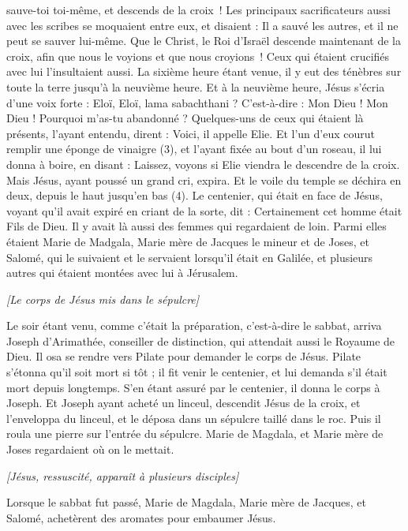 \begin{multicols}{2}
sauve-toi toi-même, et descends de la croix !
Les principaux sacrificateurs aussi avec les scribes se moquaient entre eux, et disaient : Il a sauvé les autres, et il ne peut se sauver lui-même.
Que le Christ, le Roi d’Israël descende maintenant de la croix, afin que nous le voyions et que nous croyions ! Ceux qui étaient crucifiés avec lui l’insultaient aussi.
La sixième heure étant venue, il y eut des ténèbres sur toute la terre jusqu'à la neuvième heure.
Et à la neuvième heure, Jésus s’écria d’une voix forte : Eloï, Eloï, lama sabachthani ? C’est-à-dire : Mon Dieu ! Mon Dieu ! Pourquoi m'as-tu abandonné ?
Quelques-uns de ceux qui étaient là présents, l’ayant entendu, dirent : Voici, il appelle Elie.
Et l’un d’eux courut remplir une éponge de vinaigre (3), et l'ayant fixée au bout d'un roseau, il lui donna à boire, en disant : Laissez, voyons si Elie viendra le descendre de la croix.
Mais Jésus, ayant poussé un grand cri, expira.
Et le voile du temple se déchira en deux, depuis le haut jusqu'en bas (4).
Le centenier, qui était en face de Jésus, voyant qu'il avait expiré en criant de la sorte, dit : Certainement cet homme était Fils de Dieu.
Il y avait là aussi des femmes qui regardaient de loin. Parmi elles étaient Marie de Madgala, Marie mère de Jacques le mineur et de Joses, et Salomé,
qui le suivaient et le servaient lorsqu'il était en Galilée, et plusieurs autres qui étaient montées avec lui à Jérusalem.
\begin{center}
\textit{[Le corps de Jésus mis dans le sépulcre]}
\end{center}
\PPE{}
Le soir étant venu, comme c'était la préparation, c’est-à-dire le sabbat,
arriva Joseph d'Arimathée, conseiller de distinction, qui attendait aussi le Royaume de Dieu. Il osa se rendre vers Pilate pour demander le corps de Jésus.
Pilate s'étonna qu'il soit mort si tôt ; il fit venir le centenier, et lui demanda s'il était mort depuis longtemps.
S’en étant assuré par le centenier, il donna le corps à Joseph.
Et Joseph ayant acheté un linceul, descendit Jésus de la croix, et l'enveloppa du linceul, et le déposa dans un sépulcre taillé dans le roc. Puis il roula une pierre sur l'entrée du sépulcre.
Marie de Magdala, et Marie mère de Joses regardaient où on le mettait.
\begin{center}
\textit{[Jésus, ressuscité, apparaît à plusieurs disciples]}
\end{center}
\VerseOne{}Lorsque le sabbat fut passé, Marie de Magdala, Marie mère de Jacques, et Salomé, achetèrent des aromates pour embaumer Jésus.

\end{multicols}

